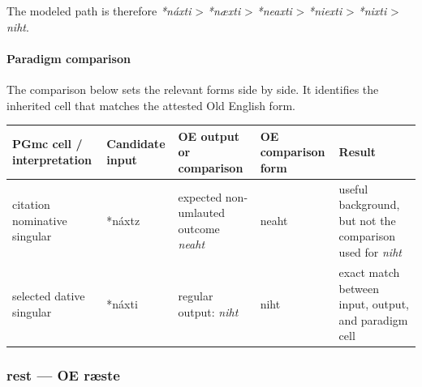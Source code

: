 \documentclass[
  british,
  a4paper,
]{article}
\newcounter{none} %
\begin{document}
The modeled path is therefore \emph{*náxti} \textgreater{} \emph{*næxti}
\textgreater{} \emph{*neaxti} \textgreater{} \emph{*niexti}
\textgreater{} \emph{*nixti} \textgreater{} \emph{niht}.

\paragraph{Paradigm comparison}\label{paradigm-comparison-12}

The comparison below sets the relevant forms side by side. It identifies
the inherited cell that matches the attested Old English form.

{\def\LTcaptype{none} %
\begin{longtable}[]{@{}
  >{\raggedright\arraybackslash}p{}
  >{\raggedright\arraybackslash}p{}
  >{\raggedright\arraybackslash}p{}
  >{\raggedright\arraybackslash}p{}
  >{\raggedright\arraybackslash}p{}@{}}
\toprule\noalign{}
\begin{minipage}[b]{\linewidth}\raggedright
PGmc cell / interpretation
\end{minipage} & \begin{minipage}[b]{\linewidth}\raggedright
Candidate input
\end{minipage} & \begin{minipage}[b]{\linewidth}\raggedright
OE output or comparison
\end{minipage} & \begin{minipage}[b]{\linewidth}\raggedright
OE comparison form
\end{minipage} & \begin{minipage}[b]{\linewidth}\raggedright
Result
\end{minipage} \\
\midrule\noalign{}
\endhead
\bottomrule\noalign{}
\endlastfoot
citation nominative singular & *náxtz & expected non-umlauted outcome
\emph{neaht} & neaht & useful background, but not the comparison used
for \emph{niht} \\
selected dative singular & *náxti & regular output: \emph{niht} & niht &
exact match between input, output, and paradigm cell \\
\end{longtable}
}

\subsubsection{rest --- OE ræste}\label{rest-oe-ruxe6ste}
\end{document}
